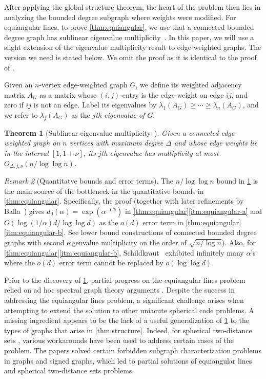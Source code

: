 \documentclass[reqno, 11pt]{amsart}
\newtheorem{theorem}{Theorem}[section]
\theoremstyle{definition}
\theoremstyle{remark}
\newtheorem{remark}[theorem]{Remark}
\begin{document}
After applying the global structure theorem, the heart of the problem then lies in analyzing the bounded degree subgraph where weights were modified. 
For equiangular lines, to prove \cref{thm:equiangular}, we use that a connected bounded degree graph has sublinear eigenvalue multiplicity~\cite{JTYZZ21}.
In this paper, we will use a slight extension of the eigenvalue multiplicity result to edge-weighted graphs. The version we need is stated below. We omit the proof as it is identical to the proof of \cite[Theorem 2.1]{JTYZZ21}.

Given an $n$-vertex edge-weighted graph $G$, we define its weighted adjacency matrix $A_G$ as a matrix whose $(i,j)$-entry is the edge-weight on edge $ij$, and zero if $ij$ is not an edge. Label its eigenvalues by $\lambda_1(A_G) \ge \cdots \ge \lambda_n(A_G)$, and we refer to $\lambda_j(A_G)$ as the \emph{$j$th eigenvalue of $G$}.


\begin{theorem}[Sublinear eigenvalue multiplicity~\cite{JTYZZ21}]\label{thm:eigen-mult} 
Given a connected edge-weighted graph on $n$ vertices with maximum degree $\Delta$ and whose edge weights lie in the interval $[1, 1+\nu]$, its $j$th eigenvalue has multiplicity at most $O_{\Delta,j,\nu}(n/\log\log n)$.
\end{theorem}

\begin{remark}[Quantitatve bounds and error terms]
The $n/\log\log n$ bound in \cref{thm:eigen-mult} is the main source of the bottleneck in the quantitative bounds in \cref{thm:equiangular}. Specifically, the proof (together with later refinements by Balla~\cite{Bal21+}) gives $d_0(\alpha) = \exp(\alpha^{-Ck})$ in \cref{thm:equiangular}\ref{itm:equiangular-a} and $O(\log(1/\alpha) d/\log\log d)$ as the $o(d)$ error term in \cref{thm:equiangular}\ref{itm:equiangular-b}. See \cite{HSSZ22} lower bound constructions of connected bounded degree graphs with second eigenvalue multiplicity on the order of $\sqrt{n/\log n}$). Also, for \cref{thm:equiangular}\ref{itm:equiangular-b}, Schildkraut~\cite{Sch23+} exhibited infinitely many $\alpha$'s where the $o(d)$ error term cannot be replaced by $o(\log\log d)$.
\end{remark}


Prior to the discovery of \cref{thm:eigen-mult}, partial progress on the equiangular lines problem relied on ad hoc spectral graph theory arguments \cite{BDKS18,JP20}. Despite the success in addressing the equiangular lines problem, a significant challenge arises when attempting to extend the solution to other uniacute spherical code problems. 
A missing ingredient appears to be the lack of a useful generalization of \cref{thm:eigen-mult} to the types of graphs that arise in \cref{thm:structure}.
Indeed, for spherical two-distance sets \cite{JTYZZ23,JP21+}, various workarounds have been used to address certain cases of the problem.
The papers \cite{JP20,JP21+} solved certain forbidden subgraph characterization problems in graphs and signed graphs, which led to partial solutions of equiangular lines and spherical two-distance sets problems.
\end{document}
